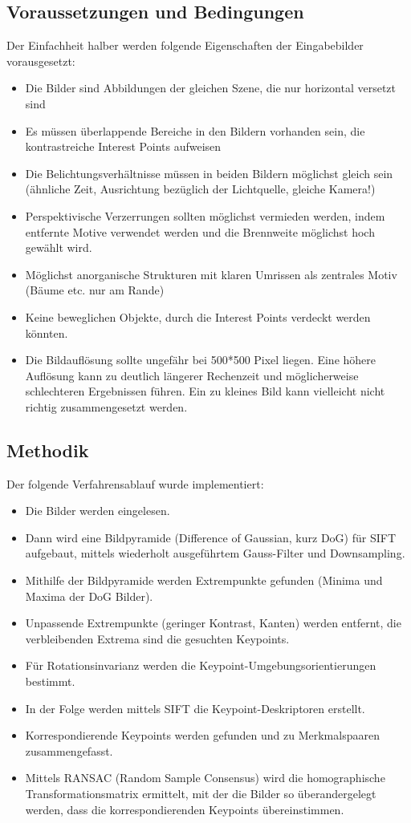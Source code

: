 \documentclass[deutsch]{scrartcl}
\begin{document}
\subsection{Voraussetzungen und Bedingungen}
Der Einfachheit halber werden folgende Eigenschaften der Eingabebilder vorausgesetzt:
\begin{itemize}
	\item Die Bilder sind Abbildungen der gleichen Szene, die nur horizontal versetzt sind
	\item Es müssen überlappende Bereiche in den Bildern vorhanden sein, die kontrastreiche Interest Points aufweisen
	\item Die Belichtungsverhältnisse müssen in beiden Bildern möglichst gleich sein (ähnliche Zeit, Ausrichtung bezüglich der Lichtquelle, gleiche Kamera!)
	\item Perspektivische Verzerrungen sollten möglichst vermieden werden, indem entfernte Motive verwendet werden und die Brennweite möglichst hoch gewählt wird.
	\item Möglichst anorganische Strukturen mit klaren Umrissen als zentrales Motiv (Bäume etc. nur am Rande)
	\item Keine beweglichen Objekte, durch die Interest Points verdeckt werden könnten.
	\item Die Bildauflösung sollte ungefähr bei 500*500 Pixel liegen. Eine höhere
	Auflösung kann zu deutlich längerer Rechenzeit und möglicherweise schlechteren
	Ergebnissen führen. Ein zu kleines Bild kann vielleicht nicht richtig
	zusammengesetzt werden.
\end{itemize}

\subsection{Methodik}
Der folgende Verfahrensablauf wurde implementiert:
\begin{itemize}
	\item Die Bilder werden eingelesen.
	\item Dann wird eine Bildpyramide (Difference of Gaussian, kurz DoG) für SIFT aufgebaut, mittels wiederholt ausgeführtem Gauss-Filter und Downsampling.
	\item Mithilfe der Bildpyramide werden Extrempunkte gefunden (Minima und Maxima der DoG Bilder).
	\item Unpassende Extrempunkte (geringer Kontrast, Kanten) werden entfernt, die verbleibenden Extrema sind die gesuchten Keypoints.
	\item Für Rotationsinvarianz werden die Keypoint-Umgebungsorientierungen bestimmt.
	\item In der Folge werden mittels SIFT die Keypoint-Deskriptoren erstellt.
	\item Korrespondierende Keypoints werden gefunden und zu Merkmalspaaren zusammengefasst.
	\item Mittels RANSAC (Random Sample Consensus) wird die homographische Transformationsmatrix ermittelt, mit der die Bilder so überandergelegt werden, dass die korrespondierenden Keypoints übereinstimmen.
\end{itemize}
\end{document}
